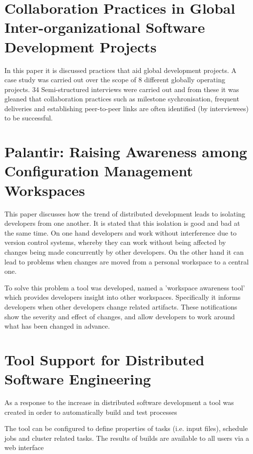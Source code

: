 \documentclass{l4proj}
\begin{document}
\section {Collaboration Practices in Global Inter-organizational Software Development Projects}

In this paper it is discussed practices that aid global development projects.  A case study was carried out over the scope of 8 different globally operating projects.  34 Semi-structured interviews were carried out and from these it was gleaned that collaboration practices such as milestone sychronisation, frequent deliveries and establishing peer-to-peer links are often identified (by interviewees) to be successful. 


\section {Palantir: Raising Awareness among Configuration Management Workspaces}

This paper discusses how the trend of distributed development leads to isolating developers from one another.  It is stated that this isolation is good and bad at the same time.  On one hand developers and work without interference due to version control systems, whereby they can work without being affected by changes being made concurrently by other developers.  On the other hand it can lead to problems when changes are moved from a personal workspace to a central one.  

To solve this problem a tool was developed, named a 'workspace awareness tool' which provides developers insight into other workspaces.  Specifically it informs developers when other developers change related artifacts.  These notifications show the severity and effect of changes, and allow developers to work around what has been changed in advance.

\section {Tool Support for Distributed Software Engineering}

As a response to the increase in distributed software development a tool was created in order to automatically build and test processes

The tool can be configured to define properties of tasks (i.e. input files), schedule jobs and cluster related tasks.  The results of builds are available to all users via a web interface
\end{document}
